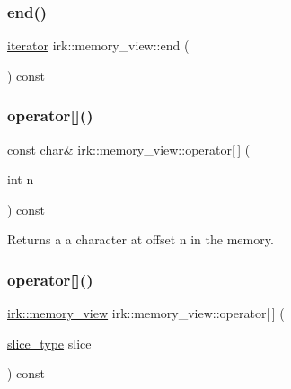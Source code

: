 \subsubsection{\texorpdfstring{end()}{end()}}
{\footnotesize\ttfamily \mbox{\hyperlink{classirk_1_1memory__view_1_1iterator}{iterator}} irk\+::memory\+\_\+view\+::end (\begin{DoxyParamCaption}{ }\end{DoxyParamCaption}) const\hspace{0.3cm}{\ttfamily [inline]}}

\mbox{\label{classirk_1_1memory__view_a944d6187b25fdf17347959362c55a9da}} 
\subsubsection{\texorpdfstring{operator[]()}{operator[]()}\hspace{0.1cm}{\footnotesize\ttfamily [1/2]}}
{\footnotesize\ttfamily const char\& irk\+::memory\+\_\+view\+::operator\mbox{[}$\,$\mbox{]} (\begin{DoxyParamCaption}\item[{int}]{n }\end{DoxyParamCaption}) const\hspace{0.3cm}{\ttfamily [inline]}}



Returns a a character at offset {\ttfamily n} in the memory. 

\mbox{\label{classirk_1_1memory__view_ae16ba32b9419a8918762132186a00463}} 
\subsubsection{\texorpdfstring{operator[]()}{operator[]()}\hspace{0.1cm}{\footnotesize\ttfamily [2/2]}}
{\footnotesize\ttfamily \mbox{\hyperlink{classirk_1_1memory__view}{irk\+::memory\+\_\+view}} irk\+::memory\+\_\+view\+::operator\mbox{[}$\,$\mbox{]} (\begin{DoxyParamCaption}\item[{\mbox{\hyperlink{classirk_1_1memory__view_ac0c1d9600bf81e8cb861a89ab104a43c}{slice\+\_\+type}}}]{slice }\end{DoxyParamCaption}) const\hspace{0.3cm}{\ttfamily [inline]}}



